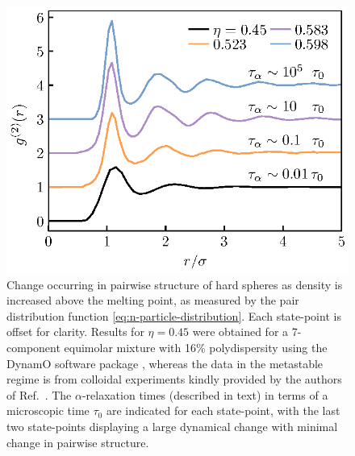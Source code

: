 \documentclass[11pt,twoside]{report}
\begin{document}
\begin{figure}
  \includegraphics[width=0.9\linewidth,outer]{g2-evolution}
  \caption[Structural change in the supercooled liquid (at the pair level)]{
    Change occurring in pairwise structure of hard spheres as density is increased above the melting point, as measured by the pair distribution function \eqref{eq:n-particle-distribution}.
    Each state-point is offset for clarity.
    Results for $\eta = 0.45$ were obtained for a 7-component equimolar mixture with 16\% polydispersity using the DynamO software package \cite{BannermanJCC2011}, whereas the data in the metastable regime is from colloidal experiments kindly provided by the authors of Ref.\ \cite{HallettNC2018}.
    The $\alpha$-relaxation times (described in text) in terms of a microscopic time $\tau_0$ are indicated for each state-point, with the last two state-points displaying a large dynamical change with minimal change in pairwise structure.
  }
  \label{fig:g2-changes}
\end{figure}
\end{document}
